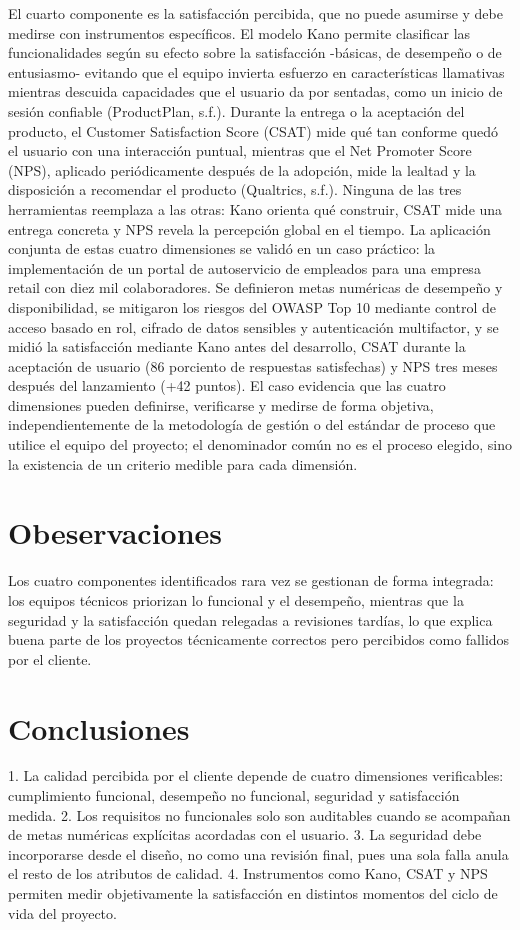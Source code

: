 \documentclass[
	article,			%
	11pt,				%
	oneside,			%
	a4paper,			%
	english,			%
	brazil,				%
	sumario=tradicional
	]{abntex2}
\begin{document}
El cuarto componente es la satisfacción percibida, que no puede asumirse y debe medirse con instrumentos específicos. El modelo Kano permite clasificar las funcionalidades según su efecto sobre la satisfacción -básicas, de desempeño o de entusiasmo- evitando que el equipo invierta esfuerzo en características llamativas mientras descuida capacidades que el usuario da por sentadas, como un inicio de sesión confiable (ProductPlan, s.f.). Durante la entrega o la aceptación del producto, el Customer Satisfaction Score (CSAT) mide qué tan conforme quedó el usuario con una interacción puntual, mientras que el Net Promoter Score (NPS), aplicado periódicamente después de la adopción, mide la lealtad y la disposición a recomendar el producto (Qualtrics, s.f.). Ninguna de las tres herramientas reemplaza a las otras: Kano orienta qué construir, CSAT mide una entrega concreta y NPS revela la percepción global en el tiempo.
La aplicación conjunta de estas cuatro dimensiones se validó en un caso práctico: la implementación de un portal de autoservicio de empleados para una empresa retail con diez mil colaboradores. Se definieron metas numéricas de desempeño y disponibilidad, se mitigaron los riesgos del OWASP Top 10 mediante control de acceso basado en rol, cifrado de datos sensibles y autenticación multifactor, y se midió la satisfacción mediante Kano antes del desarrollo, CSAT durante la aceptación de usuario (86 porciento de respuestas satisfechas) y NPS tres meses después del lanzamiento (+42 puntos). El caso evidencia que las cuatro dimensiones pueden definirse, verificarse y medirse de forma objetiva, independientemente de la metodología de gestión o del
estándar de proceso que utilice el equipo del proyecto; el denominador común no es el proceso elegido, sino la existencia de un criterio medible para cada dimensión.

\section{Obeservaciones}
Los cuatro componentes identificados rara vez se gestionan de forma
integrada: los equipos técnicos priorizan lo funcional y el desempeño, mientras que la seguridad y la satisfacción quedan relegadas a revisiones tardías, lo que explica buena parte de los proyectos técnicamente correctos pero percibidos como fallidos por el cliente.


\section{Conclusiones}
1. La calidad percibida por el cliente depende de cuatro dimensiones verificables: cumplimiento funcional, desempeño no funcional, seguridad y satisfacción medida.
2. Los requisitos no funcionales solo son auditables cuando se acompañan de metas numéricas explícitas acordadas con el usuario.
3. La seguridad debe incorporarse desde el diseño, no como una revisión final, pues una sola falla anula el resto de los atributos de calidad.
4. Instrumentos como Kano, CSAT y NPS permiten medir objetivamente la satisfacción en distintos momentos del ciclo de vida del proyecto.
\end{document}

